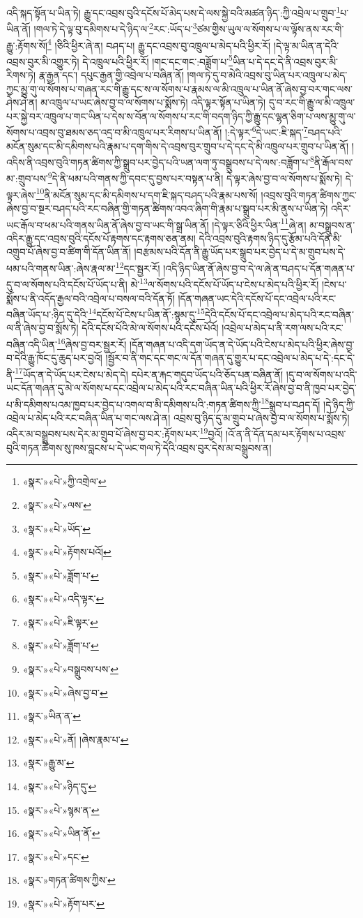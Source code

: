འདི་སྐད་སྟོན་པ་ཡིན་ཏེ། རྒྱུ་དང་འབྲས་བུའི་དངོས་པོ་མེད་པས་དེ་ལས་སྐྱེ་བའི་མཚན་ཉིད་:ཀྱི་འབྲེལ་པ་གྲུབ་\footnote{«སྣར་»«པེ་»ཀྱི་འགྲེལ་}པ་ཡིན་ནོ། །གལ་ཏེ་དེ་ལྟ་བུ་དམིགས་པ་དེ་ཉིད་ལ་\footnote{«སྣར་»«པེ་»ལས་}རང་:ཡོད་པ་\footnote{«སྣར་»«པེ་»ཡོད་}ཙམ་གྱིས་ཡུལ་ལ་སོགས་པ་ལ་ལྟོས་ནས་རང་གི་རྒྱུ་:རྟོགས་སོ།\footnote{«སྣར་»«པེ་»རྟོགས་པའོ།} །ཅིའི་ཕྱིར་ཞེ་ན། བཤད་པ། རྒྱུ་དང་འབྲས་བུ་འཁྲུལ་པ་མེད་པའི་ཕྱིར་རོ། །དེ་ལྟ་མ་ཡིན་ན་དེའི་འབྲས་བུར་མི་འགྱུར་ཏེ། དེ་འཁྲུལ་པའི་ཕྱིར་རོ། །གང་དང་གང་:བཟློག་པ་\footnote{«སྣར་»«པེ་»ཟློག་པ་}ཡིན་པ་དེ་དང་དེ་ནི་འབྲས་བུར་མི་རིགས་ཏེ། རྣ་རྒྱན་དང་། དཔུང་རྒྱན་གྱི་འབྲེལ་པ་བཞིན་ནོ། །གལ་ཏེ་དུ་བ་མེའི་འབྲས་བུ་ཡིན་པར་འཁྲུལ་པ་མེད་ཀྱང་མྱུ་གུ་ལ་སོགས་པ་གཞན་རང་གི་རྒྱུ་དང་ས་ལ་སོགས་པ་རྣམས་ལ་མི་འཁྲུལ་པ་ཡིན་ནོ་ཞེས་བྱ་བར་གང་ལས་ཤེས་ཤེ་ན། མ་འཁྲུལ་པ་ཡང་ཞེས་བྱ་བ་ལ་སོགས་པ་སྨོས་ཏེ། འདི་ལྟར་སྟོན་པ་ཡིན་ཏེ། དུ་བ་རང་གི་རྒྱུ་ལ་མི་འཁྲུལ་པར་སྐྱེ་བར་འཁྲུལ་པ་གང་ཡིན་པ་དེས་ས་བོན་ལ་སོགས་པ་རང་གི་བདག་ཉིད་ཀྱི་རྒྱུ་དང་ལྷན་ཅིག་པ་ལས་མྱུ་གུ་ལ་སོགས་པ་འབྲས་བུ་ཐམས་ཅད་འདྲ་བ་མི་འཁྲུལ་པར་རིགས་པ་ཡིན་ནོ། །:དེ་ལྟར་\footnote{«སྣར་»«པེ་»འདི་ལྟར་}དེ་ཡང་:ཇི་སྐད་\footnote{«སྣར་»«པེ་»ཇི་ལྟར་}བཤད་པའི་མངོན་སུམ་དང་མི་དམིགས་པའི་རྣམ་པ་དག་གིས་དེ་འབྲས་བུར་གྲུབ་པ་དེ་དང་དེ་མི་འཁྲུལ་པར་གྲུབ་པ་ཡིན་ནོ། །འདིས་ནི་འབྲས་བུའི་གཏན་ཚིགས་ཀྱི་སྒྲུབ་པར་བྱེད་པའི་ཡན་ལག་ཏུ་བསྒྲུབས་པ་དེ་ལས་:བཟློག་པ་\footnote{«སྣར་»«པེ་»ཟློག་པ་}ནི་རྒོལ་བས་མ་:གྲུབ་པས་\footnote{«སྣར་»«པེ་»བསྒྲུབས་པས་}དེ་ནི་ཕམ་པའི་གནས་ཀྱི་དབང་དུ་བྱས་པར་བསྟན་པ་ནི། དེ་ལྟར་ཞེས་བྱ་བ་ལ་སོགས་པ་སྨོས་ཏེ། དེ་ལྟར་ཞེས་\footnote{«སྣར་»«པེ་»ཞེས་བྱ་བ་}ནི་མངོན་སུམ་དང་མི་དམིགས་པ་དག་ཇི་སྐད་བཤད་པའི་རྣམ་པས་སོ། །འབྲས་བུའི་གཏན་ཚིགས་ཀྱང་ཞེས་བྱ་བ་སྔར་བཤད་པའི་རང་བཞིན་གྱི་གཏན་ཚིགས་འབའ་ཞིག་གི་རྣམ་པ་སྒྲུབ་པར་མི་ནུས་པ་ཡིན་ཏེ། འདིར་ཡང་རྒོལ་བ་ཕམ་པའི་གནས་ཡིན་ནོ་ཞེས་བྱ་བ་ཡང་གི་སྒྲ་ཡིན་ནོ། །དེ་ལྟར་ཅིའི་ཕྱིར་ཡིན་\footnote{«སྣར་»ཡིན་ན་}ཞེ་ན། མ་བསྒྲུབས་ན་འདིར་རྒྱུ་དང་འབྲས་བུའི་དངོས་པོ་རྟགས་དང་རྟགས་ཅན་ནམ། དེའི་འབྲས་བུའི་རྟགས་ཉིད་དུ་རྩོམ་པའི་དོན་མི་འགྲུབ་པོ་ཞེས་བྱ་བ་ཚིག་གི་དོན་ཡིན་ནོ། །བརྩམས་པའི་དོན་ནི་རྒྱུ་ཡོད་པར་སྒྲུབ་པར་བྱེད་པ་དེ་མ་གྲུབ་པས་དེ་ཕམ་པའི་གནས་ཡིན་:ཞེས་རྣལ་མ་\footnote{«སྣར་»«པེ་»ནོ། །ཞེས་རྣམ་པ་}དང་སྦྱར་རོ། །འདི་ཉིད་ཡིན་ནོ་ཞེས་བྱ་བ་དེ་ལ་ཞེ་ན་བཤད་པ་དོན་གཞན་པ་དུ་བ་ལ་སོགས་པའི་དངོས་པོ་ཡོད་པ་ནི། མེ་\footnote{«སྣར་»རྒྱུ་མ་}ལ་སོགས་པའི་དངོས་པོ་ཡོད་པ་ངེས་པ་མེད་པའི་ཕྱིར་རོ། །ངེས་པ་སྨོས་པ་ནི་འདོད་རྒྱལ་བའི་འབྲེལ་པ་བསལ་བའི་དོན་ཏོ། །དོན་གཞན་ཡང་དེའི་དངོས་པོ་དང་འབྲེལ་པའི་རང་བཞིན་ཡོད་པ་:ཉིད་དུ་དེའི་\footnote{«སྣར་»«པེ་»ཉིད་དུ་}དངོས་པོ་ངེས་པ་ཡིན་ནོ་:སྙམ་དུ་\footnote{«སྣར་»«པེ་»སྙམ་ན་}དེའི་དངོས་པོ་དང་འབྲེལ་པ་མེད་པའི་རང་བཞིན་ལ་ནི་ཞེས་བྱ་བ་སྨོས་ཏེ། དེའི་དངོས་པོའི་མེ་ལ་སོགས་པའི་དངོས་པོའོ། །འབྲེལ་པ་མེད་པ་ནི་རག་ལས་པའི་རང་བཞིན་འདི་ཡིན་\footnote{«སྣར་»«པེ་»ཡིན་ནོ་}ཞེས་བྱ་བར་སྦྱར་རོ། །དོན་གཞན་པ་འདི་དག་ཡོད་ན་དེ་ཡོད་པའི་ངེས་པ་མེད་པའི་ཕྱིར་ཞེས་བྱ་བ་དེའི་རྒྱུ་ཁོང་དུ་ཆུད་པར་བྱའོ། །སྦྱོར་བ་ནི་གང་དང་གང་ལ་དོན་གཞན་དུ་གྱུར་པ་དང་འབྲེལ་པ་མེད་པ་དེ་:དང་དེ་ནི་\footnote{«སྣར་»«པེ་»དང་}ཡོད་ན་དེ་ཡོད་པར་ངེས་པ་མེད་དེ། དཔེར་ན་རྐང་གདུབ་ཡོད་པའི་ཅོད་པན་བཞིན་ནོ། །དུ་བ་ལ་སོགས་པ་འདི་ཡང་དོན་གཞན་དུ་མེ་ལ་སོགས་པ་དང་འབྲེལ་པ་མེད་པའི་རང་བཞིན་ཡིན་པའི་ཕྱིར་རོ་ཞེས་བྱ་བ་ནི་ཁྱབ་པར་བྱེད་པ་མི་དམིགས་པའམ་ཁྱབ་པར་བྱེད་པ་འགལ་བ་མི་དམིགས་པའི་:གཏན་ཚིགས་ཀྱི་\footnote{«སྣར་»གཏན་ཚིགས་ཀྱིས་}སྒྲུབ་པ་བཤད་དོ། །དེ་ཉིད་ཀྱི་འབྲེལ་པ་མེད་པའི་རང་བཞིན་ཡིན་པ་གང་ལས་ཤེ་ན། འབྲས་བུ་ཉིད་དུ་མ་གྲུབ་པ་ཞེས་བྱ་བ་ལ་སོགས་པ་སྨོས་ཏེ། འདིར་མ་བསྒྲུབས་པས་དེར་མ་གྲུབ་པོ་ཞེས་བྱ་བར་:རྟོགས་པར་\footnote{«སྣར་»«པེ་»རྟོག་པར་}བྱའོ། །འོ་ན་ནི་དོན་དམ་པར་རྟོགས་པ་འབྲས་བུའི་གཏན་ཚིགས་སུ་ཁས་བླངས་པ་དེ་ཡང་གལ་ཏེ་དེའི་འབྲས་བུར་དེས་མ་བསྒྲུབས་ན། 